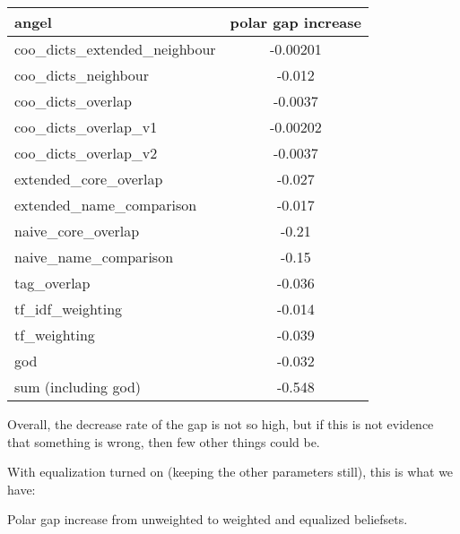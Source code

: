 \documentclass[11pt]{article}
\begin{document}
\begin{tabular}{l || c }
angel & polar gap increase \\
\hline
coo\_dicts\_extended\_neighbour & -0.00201 \\
 coo\_dicts\_neighbour &-0.012\\
 coo\_dicts\_overlap & -0.0037\\
 coo\_dicts\_overlap\_v1 & -0.00202\\
 coo\_dicts\_overlap\_v2& -0.0037\\
 extended\_core\_overlap& -0.027\\
 extended\_name\_comparison& -0.017\\
 naive\_core\_overlap& -0.21\\
 naive\_name\_comparison&  -0.15\\
 tag\_overlap&  -0.036\\
 tf\_idf\_weighting&  -0.014\\
 tf\_weighting&-0.039\\
 \hline
 god &-0.032 \\
\hline
sum (including god) & -0.548
\end{tabular}

\vspace{5pt}

Overall, the decrease rate of the gap is not so high, but if this is not evidence that something is wrong, then few other things could be.

%
%
%
%
%
%
%





With equalization turned on (keeping the other parameters still), this is what we have:

\vspace{5pt}
\begin{center}Polar gap increase from unweighted to weighted and equalized beliefsets.\end{center}
\end{document}
